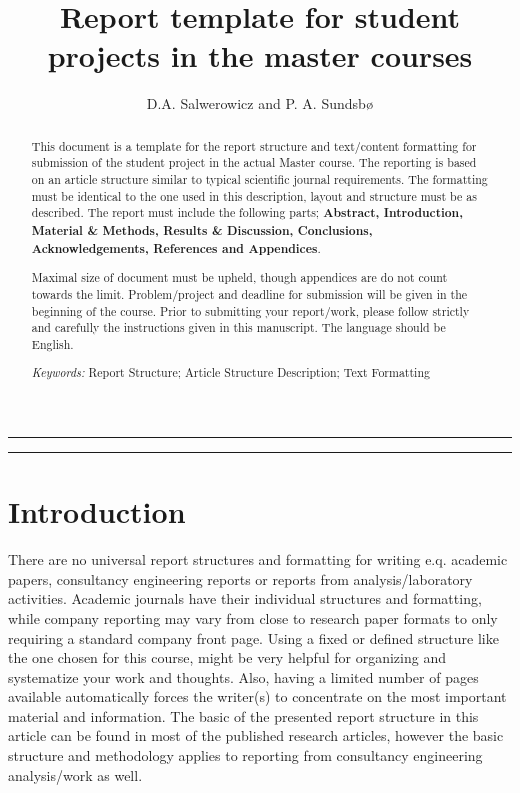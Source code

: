 \documentclass[a4paper,11pt]{extarticle}
\title{Report template for student projects in the master courses}
\author{D.A. Salwerowicz and P. A. Sundsb\o{}}
\date{\parbox{\linewidth}{\centering
    \textit{\small UiT - The Arctic University of Norway, P.O. Box 385, N-8505 Narvik, Norway}\endgraf\bigskip
    \small Submitted \today
}}
\providecommand{\keywords}[1]{\flushleft\textit{\small{Keywords:}} #1}
\begin{document}
  
\maketitle

\noindent\rule{\linewidth}{.5pt}
\begin{abstract} 
This document is a template for the report structure and text/content formatting for submission of the student project in the actual Master course. The reporting is based on an article structure similar to typical scientific journal requirements. The formatting must be identical to the one used in this description, layout and structure must be as described. The report must include the following parts; \textbf{Abstract, Introduction, Material \& Methods, Results \& Discussion, Conclusions, Acknowledgements, References and Appendices}.

Maximal size of document must be upheld, though appendices are do not count towards the limit. Problem/project and deadline for submission will be given in the beginning of the course. Prior to submitting your report/work, please follow strictly and carefully the instructions given in this manuscript. The language should be English.

\keywords{\small{Report Structure}; \small{Article Structure Description}; \small{Text Formatting}}
\end{abstract}
\rule{\linewidth}{.5pt}


\section{Introduction}
There are no universal report structures and formatting for writing e.q. academic papers, consultancy engineering reports or reports from analysis/laboratory activities. Academic journals have their individual structures and formatting, while company reporting may vary from close to research paper formats to only requiring a standard company front page. Using a fixed or defined structure like the one chosen for this course, might be very helpful for organizing and systematize your work and thoughts. Also, having a limited number of pages available automatically forces the writer(s) to concentrate on the most important material and information. The basic of the presented report structure in this article can be found in most of the published research articles, however the basic structure and methodology applies to reporting from consultancy engineering analysis/work as well.
\end{document}
